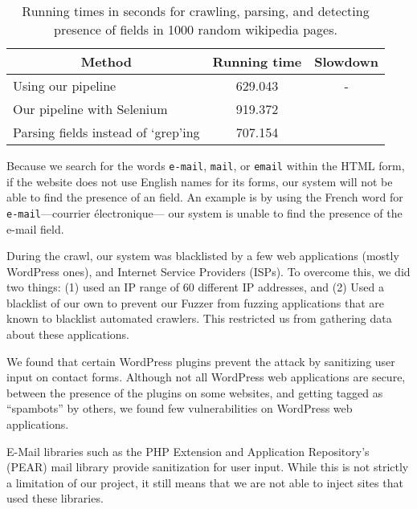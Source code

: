 		\begin{table}
			\centering
			\scriptsize
			\begin{tabular}{|p{4cm}|c|c|}
				\hline
				\multicolumn{1}{|c}{\textbf{Method}} &
				\multicolumn{1}{|c|}{\textbf{Running time}} &
				\multicolumn{1}{|c|}{\textbf{Slowdown}}
				\\
				\hline
				\centering Using our pipeline & 629.043 & - \\
				\hline
				\centering Our pipeline with Selenium & 919.372 & \slowSelenium \\
				\hline				
				\centering Parsing \email fields instead of `grep'ing& 707.154 & \slowParse \\								
				\hline
			\end{tabular}
			\caption[\titlecap{}]{Running times in seconds for crawling, parsing, and detecting presence of \email fields in 1000 random wikipedia pages.}
            \vspace{-5ex}
			\label{tab:perf}
		\end{table}

        Because we search for the words \texttt{e-mail}, \texttt{mail}, or \texttt{email} within the HTML form, if the website does not use English names for its forms, our system will not be able to find the presence of an \email field. An example is by using the French word for \texttt{e-mail}---courrier {{\'e}}lectronique--- our system is unable to find the presence of the e-mail field. 
        
		During the crawl, our system was blacklisted by a few web
        applications (mostly WordPress ones), and Internet Service
        Providers (ISPs). To overcome this, we did two things: (1)
        used an IP range of 60 different IP addresses, and (2) Used a
        blacklist of our own to prevent our Fuzzer from fuzzing
        applications that are known to blacklist automated crawlers.
        This restricted us from gathering data about these
        applications.


		We found that certain WordPress plugins prevent the \ehi attack by sanitizing user input on contact forms. Although not all  WordPress web applications are secure, between the presence of the plugins on some websites, and getting tagged as ``spambots'' by others, we found few vulnerabilities on WordPress web applications.

        E-Mail libraries such as the PHP Extension and Application Repository's (PEAR) mail library provide sanitization for user input. While this is not strictly a limitation of our project, it still means that we are not able to inject sites that used these libraries.

